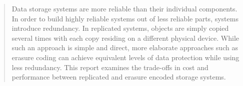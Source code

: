 \begin{abstract}
Data storage systems are more reliable than their individual components. In order to build highly reliable systems out of less reliable parts, systems introduce redundancy. In replicated systems, objects are simply copied several times with each copy residing on a different physical device. While such an approach is simple and direct, more elaborate approaches such as erasure coding can achieve equivalent levels of data protection while using less redundancy. This report examines the trade-offs in cost and performance between replicated and erasure encoded storage systems.
\end{abstract}

